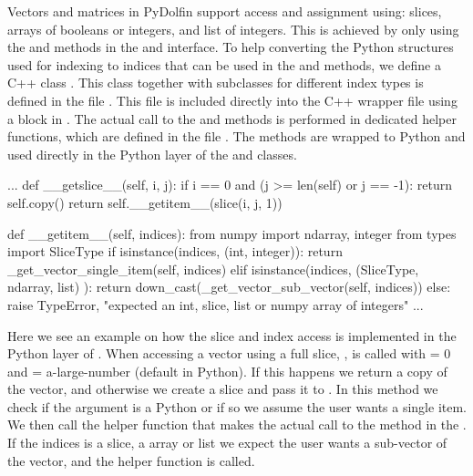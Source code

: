 Vectors and matrices in PyDolfin support access and assignment using: slices, \numpy arrays of booleans or integers, and list of integers. This is achieved by only using the  and  methods in the  and  interface. To help converting the Python structures used for indexing to indices that can be used in the  and  methods, we define a C++ class . This class together with subclasses for different index types is defined in the file . This file is included directly into the C++ wrapper file using a \emp{\%\{$\ldots$\}\%} block in . The actual call to the  and  methods is performed in dedicated helper functions, which are defined in the file . The methods are wrapped to Python and used directly in the Python layer of the  and  classes.
\begin{c++}
   ...
    def __getslice__(self, i, j):
        if i == 0 and (j >= len(self) or j == -1):
            return self.copy()
        return self.__getitem__(slice(i, j, 1))

    def __getitem__(self, indices):
        from numpy import ndarray, integer
        from types import SliceType
        if isinstance(indices, (int, integer)):
            return _get_vector_single_item(self, indices)
        elif isinstance(indices, (SliceType, ndarray, list) ):
            return down_cast(_get_vector_sub_vector(self, indices))
        else:
            raise TypeError, "expected an int, slice, list or numpy array of integers"
  ...
\end{c++}
Here we see an example on how the slice and index access is implemented in the Python layer of . When accessing a vector using a full slice, ,  is called with  = 0 and  = a-large-number (default in Python).  If this happens we return a copy of the vector, and otherwise we create a slice and pass it to . In this method we check if the  argument is a Python  or \numpy {} if so we assume the user wants a single item. We then call the helper function  that makes the actual call to the  method in the . If the indices is a slice, a \numpy array or list we expect the user wants a sub-vector of the vector, and the helper function  is called.\par

